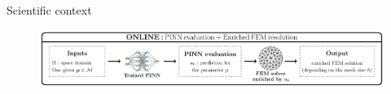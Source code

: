 \begin{frame}{Scientific context}
\begin{figure}[!ht]
		\includegraphics[width=\linewidth]{images/intro/pipeline/online.pdf}
	\end{figure}
\end{frame}

